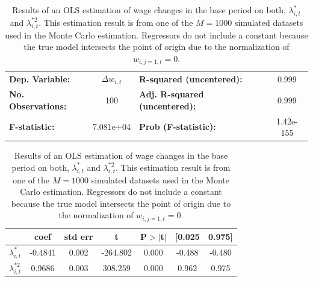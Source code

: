\documentclass[../main.tex]{subfiles}
\begin{document}
\begin{table}[!htbp]
\begin{center}
\begin{tabular}{lclc}
\toprule
\textbf{Dep. Variable:}    & $\Delta w_{i,t}$ & \textbf{  R-squared (uncentered):}      &      0.999   \\
\textbf{No. Observations:} &       100        & \textbf{  Adj. R-squared (uncentered):} &      0.999   \\
\textbf{F-statistic:}      &  7.081e+04       & \textbf{  Prob (F-statistic):}          & 1.42e-155   \\
\bottomrule
\end{tabular}
\begin{tabular}{lcccccc}
                  & \textbf{coef} & \textbf{std err} & \textbf{t} & \textbf{P$> |$t$|$} & \textbf{[0.025} & \textbf{0.975]}  \\
\midrule
\textbf{$\lambda_{i, t}^{*}$}   &        -0.4841  &        0.002     &    -264.802 &         0.000        &         -0.488   &         -0.480    \\
\textbf{$\lambda_{i, t}^{*2}$} &        	 0.9686  &        0.003     &     308.259  &         0.000        &          0.962    &          0.975    \\
\bottomrule
\end{tabular}

\end{center}
\caption{Results of an OLS estimation of wage changes in the base period on both, $\lambda_{i, t}^{*}$ and $\lambda_{i, t}^{*2}$. This estimation result is from one of the $M = 1000$ simulated datasets used in the Monte Carlo estimation. Regressors do not include a constant because the true model intersects the point of origin due to the normalization of $w_{i,j=1,t} = 0$.}
\label{tab:base_period_regression_rlst_t}
\end{table}
\FloatBarrier
\end{document}
